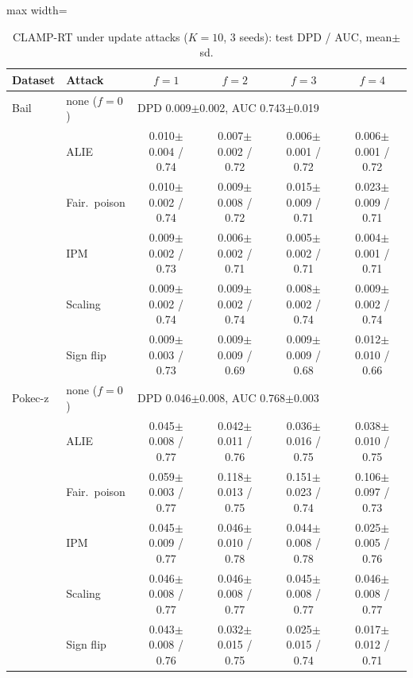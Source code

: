 \begin{table}[tbp]
\centering
\scriptsize
\setlength{\tabcolsep}{3pt}
\caption{CLAMP-RT under update attacks ($K=10$, 3 seeds): test DPD / AUC, mean$\pm$sd.}
\label{tab:s_e3}
\begin{adjustbox}{max width=\textwidth}
\begin{tabular}{llcccc}
\toprule
Dataset & Attack & $f=1$ & $f=2$ & $f=3$ & $f=4$ \\
\midrule
Bail & none ($f=0$) & \multicolumn{4}{l}{DPD 0.009$\pm$0.002, AUC 0.743$\pm$0.019} \\
 & ALIE & 0.010$\pm$0.004 / 0.74 & 0.007$\pm$0.002 / 0.72 & 0.006$\pm$0.001 / 0.72 & 0.006$\pm$0.001 / 0.72 \\
 & Fair.\ poison & 0.010$\pm$0.002 / 0.74 & 0.009$\pm$0.008 / 0.72 & 0.015$\pm$0.009 / 0.71 & 0.023$\pm$0.009 / 0.71 \\
 & IPM & 0.009$\pm$0.002 / 0.73 & 0.006$\pm$0.002 / 0.71 & 0.005$\pm$0.002 / 0.71 & 0.004$\pm$0.001 / 0.71 \\
 & Scaling & 0.009$\pm$0.002 / 0.74 & 0.009$\pm$0.002 / 0.74 & 0.008$\pm$0.002 / 0.74 & 0.009$\pm$0.002 / 0.74 \\
 & Sign flip & 0.009$\pm$0.003 / 0.73 & 0.009$\pm$0.009 / 0.69 & 0.009$\pm$0.009 / 0.68 & 0.012$\pm$0.010 / 0.66 \\
\midrule
Pokec-z & none ($f=0$) & \multicolumn{4}{l}{DPD 0.046$\pm$0.008, AUC 0.768$\pm$0.003} \\
 & ALIE & 0.045$\pm$0.008 / 0.77 & 0.042$\pm$0.011 / 0.76 & 0.036$\pm$0.016 / 0.75 & 0.038$\pm$0.010 / 0.75 \\
 & Fair.\ poison & 0.059$\pm$0.003 / 0.77 & 0.118$\pm$0.013 / 0.75 & 0.151$\pm$0.023 / 0.74 & 0.106$\pm$0.097 / 0.73 \\
 & IPM & 0.045$\pm$0.009 / 0.77 & 0.046$\pm$0.010 / 0.78 & 0.044$\pm$0.008 / 0.78 & 0.025$\pm$0.005 / 0.76 \\
 & Scaling & 0.046$\pm$0.008 / 0.77 & 0.046$\pm$0.008 / 0.77 & 0.045$\pm$0.008 / 0.77 & 0.046$\pm$0.008 / 0.77 \\
 & Sign flip & 0.043$\pm$0.008 / 0.76 & 0.032$\pm$0.015 / 0.75 & 0.025$\pm$0.015 / 0.74 & 0.017$\pm$0.012 / 0.71 \\
\bottomrule
\end{tabular}
\end{adjustbox}
\end{table}
